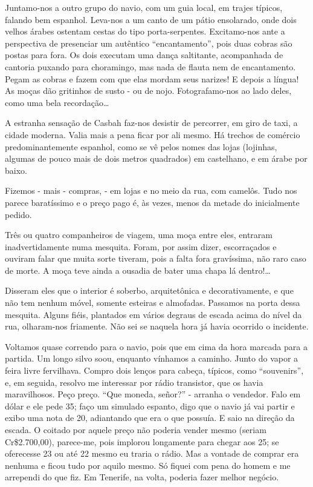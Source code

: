 Juntamo-nos a outro grupo do navio, com um guia local, em trajes típicos, falando bem espanhol. Leva-nos a um canto de um pátio ensolarado, onde dois velhos árabes ostentam cestas do tipo porta-serpentes. Excitamo-nos ante a perspectiva de presenciar um autêntico “encantamento”, pois duas cobras são postas para fora. Os dois executam uma dança saltitante, acompanhada de cantoria puxando para choramingo, mas nada de flauta nem de encantamento. Pegam as cobras e fazem com que elas mordam seus narizes! E depois a língua! As moças dão gritinhos de susto - ou de nojo. Fotografamo-nos ao lado deles, como uma bela recordação\ldots

A estranha sensação de Casbah faz-nos desistir de percorrer, em giro de taxi, a cidade moderna. Valia mais a pena ficar por ali mesmo. Há trechos de comércio predominantemente espanhol, como se vê pelos nomes das lojas (lojinhas, algumas de pouco mais de dois metros quadrados) em castelhano, e em árabe por baixo.

Fizemos - mais - compras, - em lojas e no meio da rua, com camelôs. Tudo nos parece baratíssimo e o preço pago é, às vezes, menos da metade do inicialmente pedido.

Três ou quatro companheiros de viagem, uma moça entre eles, entraram inadvertidamente numa mesquita. Foram, por assim dizer, escorraçados e ouviram falar que muita sorte tiveram, pois a falta fora gravíssima, não raro caso de morte. A moça teve ainda a ousadia de bater uma chapa lá dentro!\ldots

Disseram eles que o interior é soberbo, arquitetônica e decorativamente, e que não tem nenhum móvel, somente esteiras e almofadas. Passamos na porta dessa mesquita. Alguns fiéis, plantados em vários degraus de escada acima do nível da rua, olharam-nos friamente. Não sei se naquela hora já havia ocorrido o incidente.

Voltamos quase correndo para o navio, pois que em cima da hora marcada para a partida. Um longo silvo soou, enquanto vínhamos a caminho. Junto do vapor a feira livre fervilhava. Compro dois lenços para cabeça, típicos, como “souvenirs”, e, em seguida, resolvo me interessar por rádio transistor, que os havia maravilhosos. Peço preço. “Que moneda, señor?” - arranha o vendedor. Falo em dólar e ele pede 35; faço um simulado espanto, digo que o navio já vai partir e exibo uma nota de 20, adiantando que era o que possuía. E saio na direção da escada. O coitado por aquele preço não poderia vender mesmo (seriam Cr\$2.700,00), parece-me, pois implorou longamente para chegar aos 25; se oferecesse 23 ou até 22 mesmo eu traria o rádio. Mas a vontade de comprar era nenhuma e ficou tudo por aquilo mesmo. Só fiquei com pena do homem e me arrependi do que fiz. Em Tenerife, na volta, poderia fazer melhor negócio.

